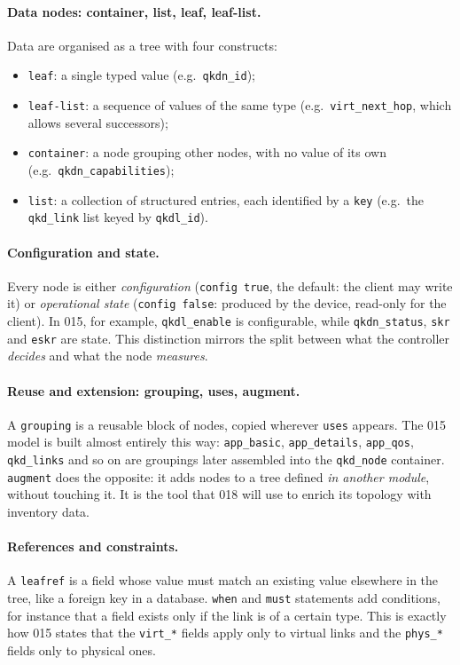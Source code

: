 \paragraph{Data nodes: container, list, leaf, leaf-list.}
Data are organised as a tree with four constructs:
\begin{itemize}
  \item \texttt{leaf}: a single typed value (e.g.\ \texttt{qkdn\_id});
  \item \texttt{leaf-list}: a sequence of values of the same type (e.g.\
        \texttt{virt\_next\_hop}, which allows several successors);
  \item \texttt{container}: a node grouping other nodes, with no value of
        its own (e.g.\ \texttt{qkdn\_capabilities});
  \item \texttt{list}: a collection of structured entries, each identified
        by a \texttt{key} (e.g.\ the \texttt{qkd\_link} list keyed by
        \texttt{qkdl\_id}).
\end{itemize}

\paragraph{Configuration and state.}
Every node is either \emph{configuration} (\texttt{config true}, the
default: the client may write it) or \emph{operational state}
(\texttt{config false}: produced by the device, read-only for the client).
In 015, for example, \texttt{qkdl\_enable} is configurable, while
\texttt{qkdn\_status}, \texttt{skr} and \texttt{eskr} are state. This
distinction mirrors the split between what the controller \emph{decides}
and what the node \emph{measures}.

\paragraph{Reuse and extension: grouping, uses, augment.}
A \texttt{grouping} is a reusable block of nodes, copied wherever
\texttt{uses} appears. The 015 model is built almost entirely this way:
\texttt{app\_basic}, \texttt{app\_details}, \texttt{app\_qos},
\texttt{qkd\_links} and so on are groupings later assembled into the
\texttt{qkd\_node} container. \texttt{augment} does the opposite: it adds
nodes to a tree defined \emph{in another module}, without touching it. It
is the tool that 018 will use to enrich its topology with inventory data.

\paragraph{References and constraints.}
A \texttt{leafref} is a field whose value must match an existing value
elsewhere in the tree, like a foreign key in a database. \texttt{when} and
\texttt{must} statements add conditions, for instance that a field exists
only if the link is of a certain type. This is exactly how 015 states that
the \texttt{virt\_*} fields apply only to virtual links and the
\texttt{phys\_*} fields only to physical ones.

